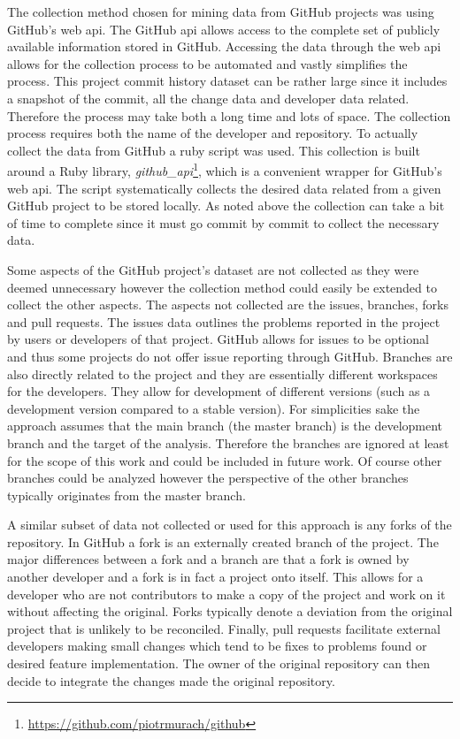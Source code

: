 
The collection method chosen for mining data from GitHub projects was using GitHub's web \gls{api}. The GitHub \gls{api} allows access to the complete set of publicly available information stored in GitHub. Accessing the data through the web \gls{api} allows for the collection process to be automated and vastly simplifies the process. This project commit history dataset can be rather large since it includes a snapshot of the commit, all the change data and developer data related. Therefore the process may take both a long time and lots of space. The collection process requires both the name of the developer and repository. To actually collect the data from GitHub a ruby script was used. This collection is built around a Ruby library, \textit{github\_api}\footnote{\url{https://github.com/piotrmurach/github}}, which is a convenient wrapper for GitHub's web \gls{api}. The script systematically collects the desired data related from a given GitHub project to be stored locally. As noted above the collection can take a bit of time to complete since it must go commit by commit to collect the necessary data.

Some aspects of the GitHub project's dataset are not collected as they were deemed unnecessary however the collection method could easily be extended to collect the other aspects. The aspects not collected are the issues, branches, forks and pull requests. The issues data outlines the problems reported in the project by users or developers of that project. GitHub allows for issues to be optional and thus some projects do not offer issue reporting through GitHub. Branches are also directly related to the project and they are essentially different workspaces for the developers. They allow for development of different versions (such as a development version compared to a stable version). For simplicities sake the approach assumes that the main branch (the master branch) is the development branch and the target of the analysis. Therefore the branches are ignored at least for the scope of this work and could be included in future work. Of course other branches could be analyzed however the perspective of the other branches typically originates from the master branch.

A similar subset of data not collected or used for this approach is any forks of the repository. In GitHub a fork is an externally created branch of the project. The major differences between a fork and a branch are that a fork is owned by another developer and a fork is in fact a project onto itself. This allows for a developer who are not contributors to make a copy of the project and work on it without affecting the original. Forks typically denote a deviation from the original project that is unlikely to be reconciled. Finally, pull requests facilitate external developers making small changes which tend to be fixes to problems found or desired feature implementation. The owner of the original repository can then decide to integrate the changes made the original repository.


